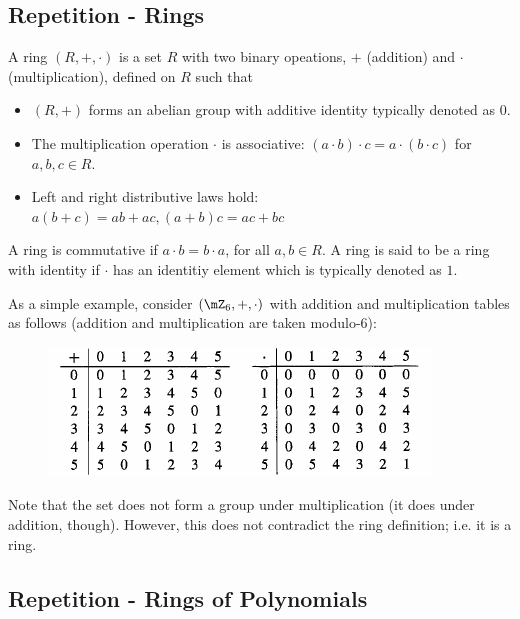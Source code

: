 
\subsection{Repetition - Rings}

\begin{definition}
  A ring $(R,+,\cdot)$ is a set $R$ with two binary opeations, $+$ (addition) and $\cdot$ (multiplication), defined on $R$ such that

  \begin{itemize}
    \item $(R,+)$ forms an abelian group with additive identity typically denoted as $0$.
    \item The multiplication operation $\cdot$ is associative: $(a \cdot b) \cdot c = a \cdot (b \cdot c)$ for $a,b,c \in R$.
    \item Left and right distributive laws hold: $a(b+c) = ab + ac, (a+b)c = ac + bc$
  \end{itemize}
%
  A ring is commutative if $a \cdot b = b \cdot a$, for all $a,b \in R$. A ring is said to be a ring with identity if $\cdot$ has an identitiy element which is typically denoted as $1$.

\end{definition}

As a simple example, consider $(\mZ_6, +, \cdot)$ with addition and multiplication tables as follows (addition and multiplication are taken modulo-6):

\begin{figure}[H]
  \includegraphics[scale=0.75]{images/cyclic_codes_01.png}
\end{figure}

Note that the set does not form a group under multiplication (it does under addition, though). However, this does not contradict the ring definition; i.e. it is a ring.


\subsection{Repetition - Rings of Polynomials}

